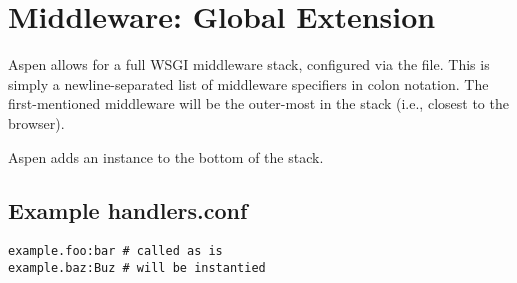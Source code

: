\section{Middleware: Global Extension \label{middleware}}

Aspen allows for a full WSGI middleware stack, configured via the
 file. This is simply a newline-separated list of
middleware specifiers in colon notation. The first-mentioned middleware will be
the outer-most in the stack (i.e., closest to the browser).

Aspen adds an  instance to the bottom of the stack.

\subsection{Example handlers.conf \label{handlers.conf}}

\begin{verbatim}
example.foo:bar # called as is
example.baz:Buz # will be instantied
\end{verbatim}